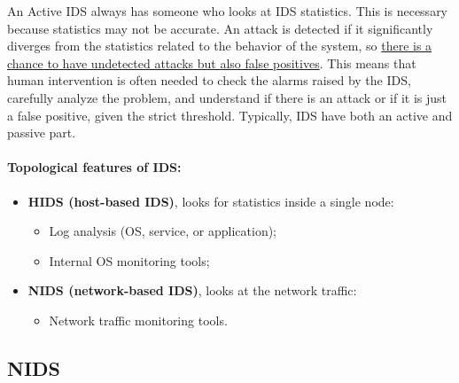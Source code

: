 An Active IDS always has someone who looks at IDS statistics. This is necessary because statistics may not be accurate. An attack is detected if it significantly diverges from the statistics related to the behavior of the system, so \ul{there is a chance to have undetected attacks but also false positives}. This means that human intervention is often needed to check the alarms raised by the IDS, carefully analyze the problem, and understand if there is an attack or if it is just a false positive, given the strict threshold. Typically, IDS have both an active and passive part.

\paragraph{Topological features of IDS:}

\begin{itemize}
	\item \textbf{HIDS (host-based IDS)}, looks for statistics inside a single node:
	      \begin{itemize}
		      \item Log analysis (OS, service, or application);
		      \item Internal OS monitoring tools;
	      \end{itemize}
	\item \textbf{NIDS (network-based IDS)}, looks at the network traffic:
	      \begin{itemize}
		      \item Network traffic monitoring tools.
	      \end{itemize}
\end{itemize}

\subsection{NIDS}

